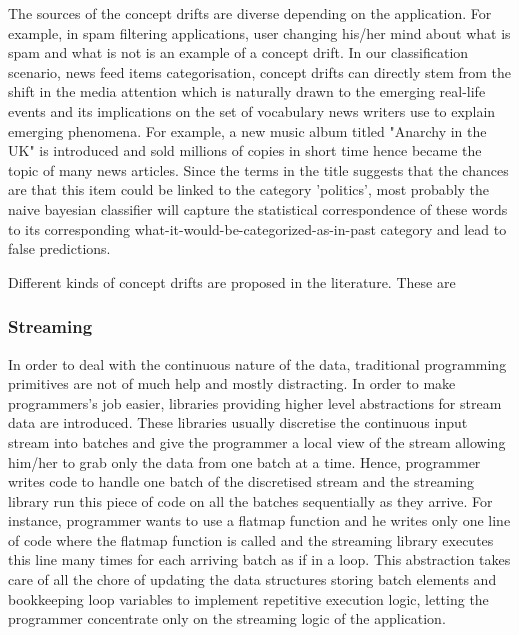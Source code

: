 \documentclass[12pt]{article}
\begin{document}
The sources of the concept drifts are diverse depending on the application. For example, in spam filtering applications, user changing his/her mind about what is spam and what is not is an example of a concept drift. In our classification scenario, news feed items categorisation, concept drifts can directly stem from the shift in the media attention which is naturally drawn to the emerging real-life events and its implications on the set of vocabulary news writers use to explain emerging phenomena. For example, a new music album titled  "Anarchy in the UK"  is introduced and sold millions of copies in short time hence became the topic of many news articles. Since the terms in the title suggests that the chances are that this item could be linked to the category 'politics', most probably the naive bayesian classifier will capture the statistical correspondence of these words to its corresponding what-it-would-be-categorized-as-in-past category and lead to false predictions.

Different kinds of concept drifts are proposed in the literature. These are 
\subsubsection{Streaming}
In order to deal with the continuous nature of the data, traditional programming primitives are not of much help and mostly distracting. In order to make programmers’s job easier, libraries providing higher level abstractions for stream data are introduced. These libraries usually discretise the continuous input stream into batches and give the programmer a local view of the stream allowing him/her to grab only the data from one batch at a time. Hence, programmer writes code to handle one batch of the discretised stream and the streaming library run this piece of code on all the batches sequentially as they arrive. For instance, programmer wants to use a flatmap function and he writes only one line of code where the flatmap function is called and the streaming library executes this line many times for each arriving batch as if in a loop. This abstraction takes care of all the chore of updating the data structures storing batch elements and bookkeeping loop variables to implement repetitive execution logic, letting the programmer concentrate only on the streaming logic of the application. 
\end{document}
